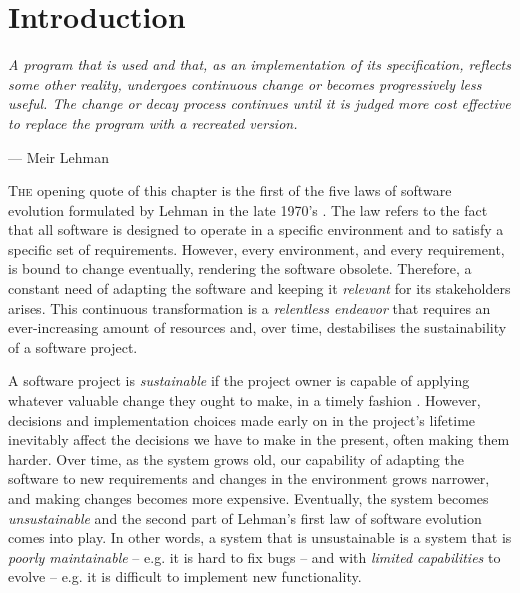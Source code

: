 \chapter{Introduction}\label{chap:introduction}

\epigraph{\emph{A program that is used and that, as an implementation of its specification, reflects some other reality, undergoes continuous change or becomes progressively less useful.
The change or decay process continues until it is judged more cost effective to replace the program with a recreated version.}}{--- Meir Lehman}

\lettrine{T}{he} opening quote of this chapter is the first of the five laws of software evolution formulated by Lehman in the late 1970's \cite{Lehman1979}.
The law refers to the fact that all software is designed to operate in a specific environment and to satisfy a specific set of requirements. 
However, every environment, and every requirement, is bound to change eventually, rendering the software obsolete. %
Therefore, a constant need of adapting the software and keeping it \emph{relevant} for its stakeholders arises.
This continuous transformation is a \emph{relentless endeavor} that requires an ever-increasing amount of resources and, over time, destabilises the sustainability of a software project.

A software project is \emph{sustainable} if the project owner is capable of applying whatever valuable change they ought to make, in a timely fashion \cite{Winters2020}.
However, decisions and implementation choices made early on in the project's lifetime inevitably affect the decisions we have to make in the present, often making them harder.
Over time, as the system grows old, our capability of adapting the software to new requirements and changes in the environment grows narrower, and making changes becomes more expensive.
Eventually, the system becomes \emph{unsustainable} and the second part of Lehman's first law of software evolution comes into play.
In other words, a system that is unsustainable is a system that is \emph{poorly maintainable} -- e.g. it is hard to fix bugs -- and with \emph{limited capabilities} to evolve -- e.g. it is difficult to implement new functionality. 

